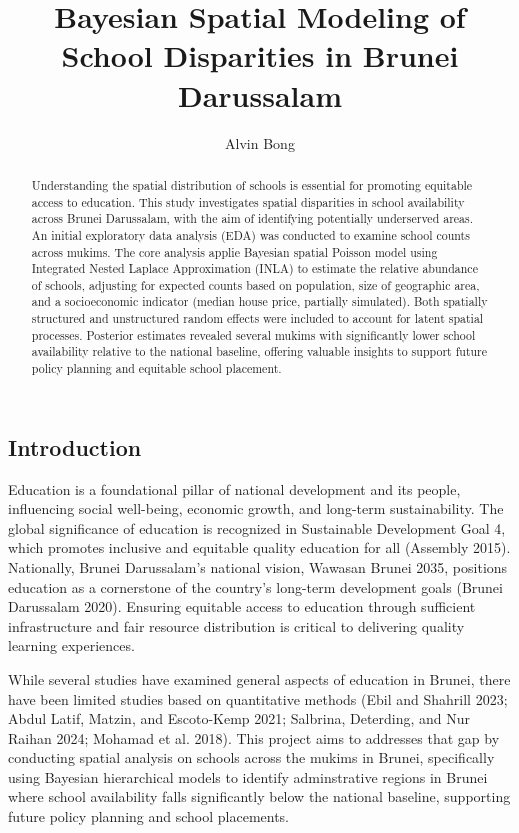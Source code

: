 \documentclass[
  12pt,
]{article}
\title{Bayesian Spatial Modeling of School Disparities in Brunei
Darussalam}
\author{Alvin Bong}
\date{}
\begin{document}
\maketitle
\begin{abstract}
Understanding the spatial distribution of schools is essential for
promoting equitable access to education. This study investigates spatial
disparities in school availability across Brunei Darussalam, with the
aim of identifying potentially underserved areas. An initial exploratory
data analysis (EDA) was conducted to examine school counts across
mukims. The core analysis applie Bayesian spatial Poisson model using
Integrated Nested Laplace Approximation (INLA) to estimate the relative
abundance of schools, adjusting for expected counts based on population,
size of geographic area, and a socioeconomic indicator (median house
price, partially simulated). Both spatially structured and unstructured
random effects were included to account for latent spatial processes.
Posterior estimates revealed several mukims with significantly lower
school availability relative to the national baseline, offering valuable
insights to support future policy planning and equitable school
placement.
\end{abstract}


\subsection{Introduction}\label{introduction}

Education is a foundational pillar of national development and its
people, influencing social well-being, economic growth, and long-term
sustainability. The global significance of education is recognized in
Sustainable Development Goal 4, which promotes inclusive and equitable
quality education for all (Assembly 2015). Nationally, Brunei
Darussalam's national vision, Wawasan Brunei 2035, positions education
as a cornerstone of the country's long-term development goals (Brunei
Darussalam 2020). Ensuring equitable access to education through
sufficient infrastructure and fair resource distribution is critical to
delivering quality learning experiences.

While several studies have examined general aspects of education in
Brunei, there have been limited studies based on quantitative methods
(Ebil and Shahrill 2023; Abdul Latif, Matzin, and Escoto-Kemp 2021;
Salbrina, Deterding, and Nur Raihan 2024; Mohamad et al. 2018). This
project aims to addresses that gap by conducting spatial analysis on
schools across the mukims in Brunei, specifically using Bayesian
hierarchical models to identify adminstrative regions in Brunei where
school availability falls significantly below the national baseline,
supporting future policy planning and school placements.
\end{document}

